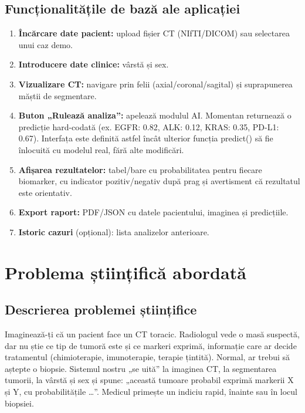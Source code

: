 \documentclass[runningheads,a4paper,11pt]{report}
\begin{document}
\section{Funcționalitățile de bază ale aplicației}
\begin{enumerate}
    \item \textbf{Încărcare date pacient:} upload fișier CT (NIfTI/DICOM) sau selectarea unui caz demo.
    \item \textbf{Introducere date clinice:} vârstă și sex.
    \item \textbf{Vizualizare CT:} navigare prin felii (axial/coronal/sagital) și suprapunerea măștii de segmentare.
    \item \textbf{Buton „Rulează analiza”:} apelează modulul AI. Momentan returnează o predicție hard-codată (ex. EGFR: 0.82, ALK: 0.12, KRAS: 0.35, PD-L1: 0.67). Interfața este definită astfel încât ulterior funcția predict() să fie înlocuită cu modelul real, fără alte modificări.
    \item \textbf{Afișarea rezultatelor:} tabel/bare cu probabilitatea pentru fiecare biomarker, cu indicator pozitiv/negativ după prag și avertisment că rezultatul este orientativ.
    \item \textbf{Export raport:} PDF/JSON cu datele pacientului, imaginea și predicțiile.
    \item \textbf{Istoric cazuri} (opțional): lista analizelor anterioare.
\end{enumerate}

\chapter{Problema științifică abordată}
\label{chapter:problema_stiintifica}

\section{Descrierea problemei științifice}
Imaginează-ți că un pacient face un CT toracic. Radiologul vede o masă suspectă, dar nu știe ce tip de tumoră este și ce markeri exprimă, informație care ar decide tratamentul (chimioterapie, imunoterapie, terapie țintită). Normal, ar trebui să aștepte o biopsie. Sistemul nostru „se uită” la imaginea CT, la segmentarea tumorii, la vârstă și sex și spune: „această tumoare probabil exprimă markerii X și Y, cu probabilitățile …”. Medicul primește un indiciu rapid, înainte sau în locul biopsiei.
\end{document}

